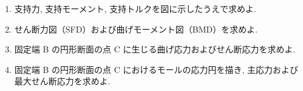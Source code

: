 \begin{enumerate}[label=(\arabic*)]
  \item 支持力, 支持モーメント, 支持トルクを図に示したうえで求めよ.

  \item せん断力図（SFD）および曲げモーメント図（BMD）を求めよ.

  \item 固定端 B の円形断面の点 C に生じる曲げ応力およびせん断応力を求めよ.

  \item 固定端 B の円形断面の点 C におけるモールの応力円を描き,
        主応力および最大せん断応力を求めよ.
\end{enumerate}
